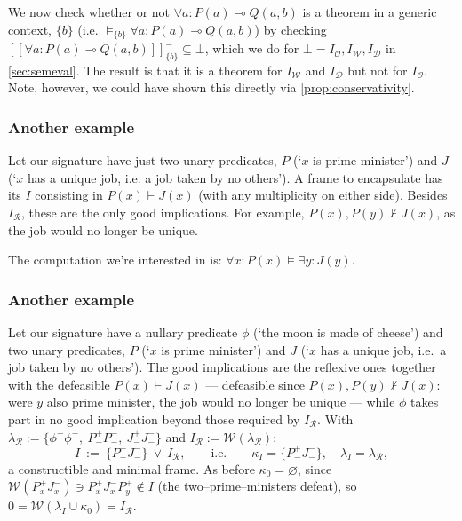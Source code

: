 \documentclass{article}
\theoremstyle{definition}
\newcommand{\cD}{\mathcal{D}}
\newcommand{\cO}{\mathcal{O}}
\newcommand{\cR}{\mathcal{R}}
\newcommand{\cW}{\mathcal{W}}
\newcommand{\bbrack}[1]{[\![ #1 ]\!]}
\begin{document}
We now check whether or not $\forall a\colon P(a)\multimap Q(a,b)$ is a theorem in a generic context, $\{b\}$ (i.e. $\vDash_{\{b\}} \forall a\colon P(a)\multimap Q(a,b)$) by checking $\bbrack{\forall a\colon P(a)\multimap Q(a,b)}^-_{\{b\}} \subseteq \bot$, which we do for $\bot=I_\cO,I_\cW,I_\cD $ in \cref{sec:semeval}. The result is that it is a theorem for $I_\cW$ and $I_\cD $ but not for $I_\cO$.
Note, however, we could have shown this directly via \cref{prop:conservativity}.


\subsubsection*{Another example}

Let our signature have just two unary predicates, $P$ (`$x$ is prime minister') and $J$ (`$x$ has a unique job, i.e. a job taken by no others'). A frame to encapsulate has its $I$ consisting in $P(x)\vdash J(x)$ (with any multiplicity on either side). Besides $I_\cR$, these are the only good implications. For example, $P(x),P(y)\nvdash J(x)$, as the job would no longer be unique.

The computation we're interested in is: $\forall x\colon P(x)\vDash \exists y\colon J(y)$.



\subsubsection*{Another example}

Let our signature have a nullary predicate $\phi$ (`the moon is made of
cheese') and two unary predicates, $P$ (`$x$ is prime minister') and $J$
(`$x$ has a unique job, i.e.\ a job taken by no others'). The good
implications are the reflexive ones together with the defeasible
$P(x)\vdash J(x)$ --- defeasible since $P(x),P(y)\nvdash J(x)$: were $y$
also prime minister, the job would no longer be unique --- while $\phi$
takes part in no good implication beyond those required by $I_\cR$. With
$\lambda_\cR:=\{\phi^+\phi^-,\ P^+_-P^-_-,\ J^+_-J^-_-\}$ and
$I_\cR:=\cW(\lambda_\cR)$:
$$I\ :=\ \{P^+_-J^-_-\}\ \vee\ I_\cR,\qquad\text{i.e.}\qquad
\kappa_I=\{P^+_-J^-_-\},\quad \lambda_I=\lambda_\cR,$$
a constructible and minimal frame. As before $\kappa_0=\varnothing$, since
$\cW(P^+_xJ^-_x)\ni P^+_xJ^-_xP^+_y\notin I$ (the two--prime--ministers
defeat), so $0=\cW(\lambda_I\cup\kappa_0)=I_\cR$.
\end{document}
